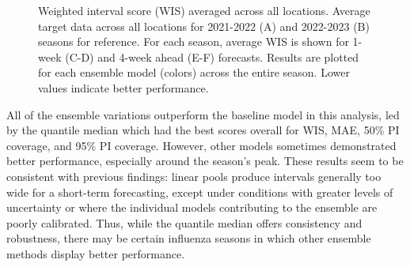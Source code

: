 \documentclass[
  letterpaper,
  DIV=11,
  numbers=noendperiod]{scrartcl}
\begin{document}
\begin{figure}


\caption{\label{fig-wis-vs-forecast-date}Weighted interval score (WIS)
averaged across all locations. Average target data across all locations
for 2021-2022 (A) and 2022-2023 (B) seasons for reference. For each
season, average WIS is shown for 1-week (C-D) and 4-week ahead (E-F)
forecasts. Results are plotted for each ensemble model (colors) across
the entire season. Lower values indicate better performance.}

\end{figure}%

All of the ensemble variations outperform the baseline model in this
analysis, led by the quantile median which had the best scores overall
for WIS, MAE, 50\% PI coverage, and 95\% PI coverage. However, other
models sometimes demonstrated better performance, especially around the
season's peak. These results seem to be consistent with previous
findings: linear pools produce intervals generally too wide for a
short-term forecasting, except under conditions with greater levels of
uncertainty or where the individual models contributing to the ensemble
are poorly calibrated. Thus, while the quantile median offers
consistency and robustness, there may be certain influenza seasons in
which other ensemble methods display better performance.
\end{document}
